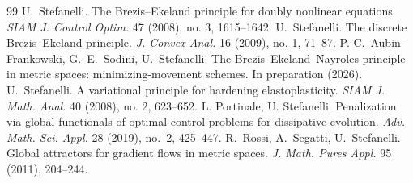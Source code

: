 \documentclass[10pt,a4paper]{amsart}
\begin{document}
\begin{thebibliography}{99}
 U.~Stefanelli. The Brezis--Ekeland principle for doubly nonlinear equations. {\it SIAM J. Control Optim.} 47 (2008), no. 3, 1615--1642.
 U.~Stefanelli. The discrete Brezis--Ekeland principle. {\it J. Convex Anal.} 16 (2009), no. 1, 71--87.
 P.-C.~Aubin--Frankowski, G.~E.~Sodini, U.~Stefanelli. The Brezis--Ekeland--Nayroles principle in metric spaces: minimizing-movement schemes. In preparation (2026).
 U.~Stefanelli. A variational principle for hardening elastoplasticity. {\it SIAM J. Math. Anal.} 40 (2008), no. 2, 623--652.
 L. Portinale, U. Stefanelli. Penalization via global functionals of optimal-control problems for dissipative evolution. {\it Adv. Math. Sci. Appl.} 28 (2019), no.~2, 425--447.
 R.~Rossi, A.~Segatti, U.~Stefanelli. Global attractors for gradient flows in metric spaces. {\it J. Math. Pures Appl.} 95 (2011), 204--244.
\end{thebibliography}
\end{document}
